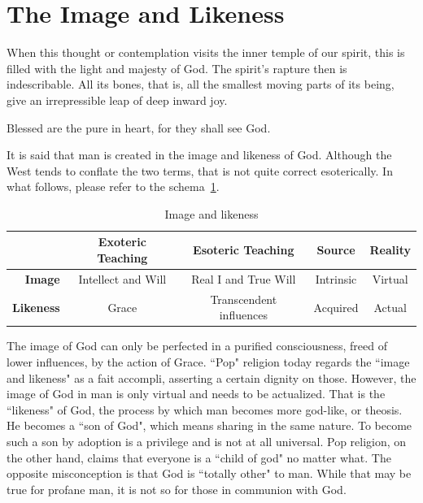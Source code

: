 \section{The Image and Likeness}

\begin{quotex}
When this thought or contemplation visits the inner temple of our spirit, this is filled with the light and majesty of God. The spirit's rapture then is indescribable. All its bones, that is, all the smallest moving parts of its being, give an irrepressible leap of deep inward joy. 

Blessed are the pure in heart, for they shall see God. 

\end{quotex}
It is said that man is created in the image and likeness of God. Although the West tends to conflate the two terms, that is not quite correct esoterically. In what follows, please refer to the schema~\ref{tab:ImageLikeness}.

\begin{table}[h]\centering\footnotesize
\label{tab:ImageLikeness}
\begin{tabular}{rcccc}\toprule
 &
\textbf{Exoteric Teaching} &
\textbf{Esoteric Teaching} &
\textbf{Source} &
\textbf{Reality}\\\midrule
\textbf{Image} &
Intellect and Will &
Real I and True Will &
Intrinsic &
Virtual\\
\textbf{Likeness} &
Grace &
Transcendent influences &
Acquired &
Actual\\\bottomrule
\end{tabular}
\caption{Image and likeness}
\end{table}
The image of God can only be perfected in a purified consciousness, freed of lower influences, by the action of Grace. ``Pop" religion today regards the ``image and likeness" as a fait accompli, asserting a certain dignity on those. However, the image of God in man is only virtual and needs to be actualized. That is the ``likeness" of God, the process by which man becomes more god-like, or theosis. He becomes a ``son of God", which means sharing in the same nature. To become such a son by adoption is a privilege and is not at all universal. Pop religion, on the other hand, claims that everyone is a ``child of god" no matter what. The opposite misconception is that God is ``totally other" to man. While that may be true for profane man, it is not so for those in communion with God.

